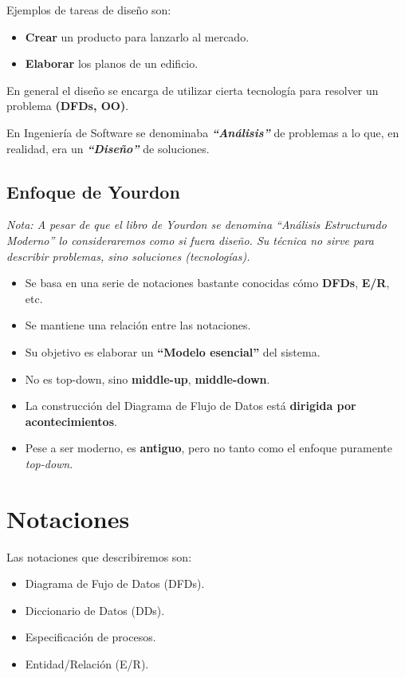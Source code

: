 Ejemplos de tareas de diseño son:

\begin{itemize}[noitemsep]
\item \textbf{Crear} un producto para lanzarlo al mercado.
\item \textbf{Elaborar} los planos de un edificio.
\end{itemize}

En general el diseño se encarga de utilizar cierta tecnología para resolver un problema \textbf{(DFDs, OO)}.

En Ingeniería de Software se denominaba \textit{\textbf{``Análisis''}} de problemas a lo que, en realidad, era un \textit{\textbf{``Diseño''}} de soluciones.

\subsection{Enfoque de Yourdon}
\textit{Nota: A pesar de que el libro de Yourdon se denomina ``Análisis Estructurado Moderno'' lo consideraremos como si fuera diseño. Su técnica no sirve para describir problemas, sino soluciones (tecnologías).}

\begin{itemize}[noitemsep]
\item Se basa en una serie de notaciones bastante conocidas cómo \textbf{DFDs}, \textbf{E/R}, etc.
\item Se mantiene una relación entre las notaciones.
\item Su objetivo es elaborar un \textbf{``Modelo esencial''} del sistema.
\item No es top-down, sino \textbf{middle-up}, \textbf{middle-down}.
\item La construcción del Diagrama de Flujo de Datos está \textbf{dirigida por acontecimientos}.
\item Pese a ser moderno, es \textbf{antiguo}, pero no tanto como el enfoque puramente \textit{top-down}.
\end{itemize}

\section{Notaciones}
Las notaciones que describiremos son:

\begin{itemize}[noitemsep]
\item Diagrama de Fujo de Datos (DFDs).
\item Diccionario de Datos (DDs).
\item Especificación de procesos.
\item Entidad/Relación (E/R).
\end{itemize}

